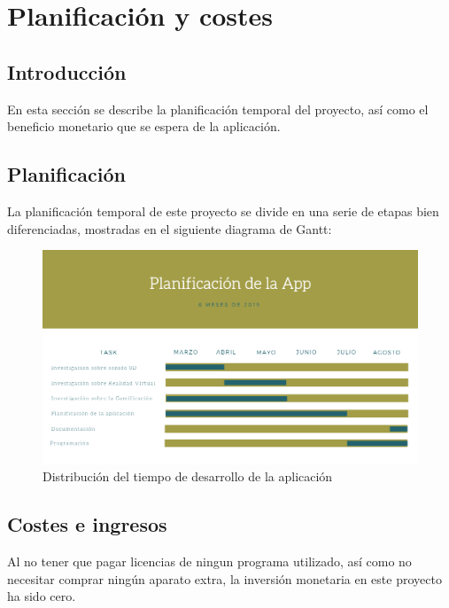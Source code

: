 \section{Planificación y costes}

\subsection{Introducción}
 
\quad En esta sección se describe la planificación temporal del proyecto, así como el beneficio monetario que se espera de la aplicación.\\

\subsection{Planificación}

\quad La planificación temporal de este proyecto se divide en una serie de etapas bien diferenciadas, mostradas en el siguiente diagrama de Gantt:\\

\begin{figure}[htb]
	\centering
	\includegraphics[width=1\textwidth]{./imagenes/diagramaGantt}
	\caption{Distribución del tiempo de desarrollo de la aplicación}
\end{figure}

\subsection{Costes e ingresos}

\quad Al no tener que pagar licencias de ningun programa utilizado, así como no necesitar comprar ningún aparato extra, la inversión monetaria en este proyecto ha sido cero.\\

